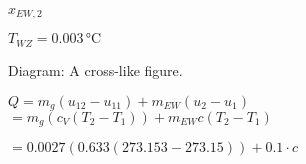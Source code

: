 \( x_{EW,2} \)  

\( T_{WZ} = 0.003 \, \text{°C} \)  

Diagram:  
A cross-like figure.  

\( Q = m_g (u_{12} - u_{11}) + m_{EW} (u_2 - u_1) \)  
\( = m_g (c_V (T_2 - T_1)) + m_{EW} c (T_2 - T_1) \)  

\( = 0.0027 (0.633 (273.153 - 273.15)) + 0.1 \cdot c \)